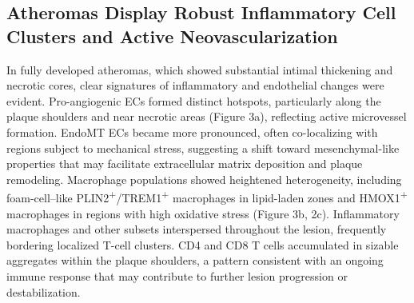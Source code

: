 \documentclass[a4paper,12pt]{article}
\begin{document}
\subsection{Atheromas Display Robust Inflammatory Cell Clusters and Active Neovascularization}
In fully developed atheromas, which showed substantial intimal thickening and necrotic cores, clear signatures of inflammatory and endothelial changes were evident. Pro-angiogenic ECs formed distinct hotspots, particularly along the plaque shoulders and near necrotic areas (Figure 3a), reflecting active microvessel formation. EndoMT ECs became more pronounced, often co-localizing with regions subject to mechanical stress, suggesting a shift toward mesenchymal-like properties that may facilitate extracellular matrix deposition and plaque remodeling. Macrophage populations showed heightened heterogeneity, including foam-cell–like PLIN2\textsuperscript{+}/TREM1\textsuperscript{+} macrophages in lipid-laden zones and HMOX1\textsuperscript{+} macrophages in regions with high oxidative stress (Figure 3b, 2c). Inflammatory macrophages and other subsets interspersed throughout the lesion, frequently bordering localized T-cell clusters. CD4 and CD8 T cells accumulated in sizable aggregates within the plaque shoulders, a pattern consistent with an ongoing immune response that may contribute to further lesion progression or destabilization.
\end{document}
